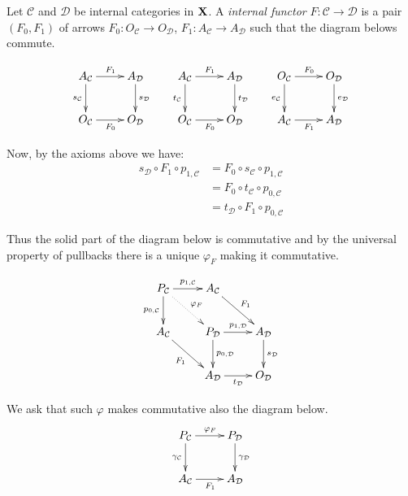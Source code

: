 \documentclass[a4paper,UKenglish,cleveref,pdftex,thm-restate,numberwithinsect]{lipics-v2021}
\def\X{\textbf {\textup{X}}}
\begin{document}
\begin{definition}
	Let $\mathcal{C}$ and $\mathcal{D}$ be internal categories in $\X$. A \emph{internal functor} $F\colon \mathcal{C}\to \mathcal{D}$ is a pair $(F_0, F_1)$ of arrows $F_0\colon O_{\mathcal{C}}\to O_{\mathcal{D}}$, $F_1\colon A_{\mathcal{C}}\to A_{\mathcal{D}}$ such that the diagram belows commute.
	
	\[\xymatrix{A_{\mathcal{C}} \ar[r]^{F_{1}}  \ar[d]_{s_{\mathcal{C}}}& A_{\mathcal{D}} \ar[d]^{s_{\mathcal{D}}}& A_{\mathcal{C}} \ar[d]_{t_{\mathcal{C}}} \ar[r]^{F_1} & A_{\mathcal{D}} \ar[d]^{t_{\mathcal{D}}} &  O_{\mathcal{C}} \ar[d]_{e_{\mathcal{C}}} \ar[r]^{F_0}& O_{\mathcal{D}} \ar[d]^{e_{\mathcal{D}}}\\ O_{\mathcal{C}} \ar[r]_{F_0} & O_{\mathcal{D}} & O_{\mathcal{C}} \ar[r]_{F_0} & O_{\mathcal{D}} & A_{\mathcal{C}} \ar[r]_{F_1} & A_{\mathcal{D}}}\]
	
	Now, by the axioms above we have:
	\begin{align*}s_{\mathcal{D}}\circ F_1\circ p_{1, \mathcal{C}} &= F_0\circ s_{\mathcal{C}} \circ p_{1, \mathcal{C}}\\&= F_0\circ t_{\mathcal{C}}\circ p_{0,\mathcal{C}}\\&=t_{\mathcal{D}}\circ F_1\circ p_{0,\mathcal{C}}\end{align*}
	
 Thus the solid part of the diagram below is commutative and by the universal property of pullbacks there is a unique $\varphi_F$ making it commutative.
	
	\[\xymatrix{P_{\mathcal{C}} \ar@{.>}[dr]^{\varphi_F} \ar[d]_{p_{0, \mathcal{C}}} \ar[r]^{p_{1, \mathcal{C}}}& A_{\mathcal{C}} \ar[dr]^{F_1}\\ A_{\mathcal{C}} \ar[dr]_{F_1} & P_{\mathcal{D}} \ar[d]^{p_{0, \mathcal{D}}} \ar[r]^{p_{1, \mathcal{D}}}& A_{\mathcal{D}} \ar[d]^{s_{\mathcal{D}}}\\ & A_{\mathcal{D}} \ar[r]_{t_{\mathcal{D}}} & O_{\mathcal{D}}}\]
	
	We ask that such $\varphi$ makes commutative also the diagram below.
	\[\xymatrix{P_{\mathcal{C}} \ar[d]_{\gamma_{\mathcal{C}}}\ar[r]^{\varphi_F} & P_{\mathcal{D}} \ar[d]^{\gamma_{\mathcal{D}}} \\ A_{\mathcal{C}} \ar[r]_{F_1} & A_{\mathcal{D}}}\]
	\end{definition}
\end{document}
